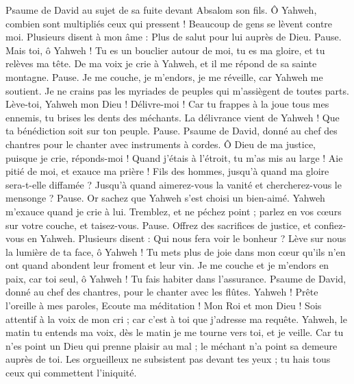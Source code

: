 \begin{multicols}{2}
\VerseOne{}Psaume de David au sujet de sa fuite devant Absalom son fils.
Ô Yahweh, combien sont multipliés ceux qui pressent ! Beaucoup de gens se lèvent contre moi.
Plusieurs disent à mon âme : Plus de salut pour lui auprès de Dieu. Pause.
Mais toi, ô Yahweh ! Tu es un bouclier autour de moi, tu es ma gloire, et tu relèves ma tête.
De ma voix je crie à Yahweh, et il me répond de sa sainte montagne. Pause.
Je me couche, je m’endors, je me réveille, car Yahweh me soutient.
Je ne crains pas les myriades de peuples qui m’assiègent de toutes parts.
Lève-toi, Yahweh mon Dieu ! Délivre-moi ! Car tu frappes à la joue tous mes ennemis, tu brises les dents des méchants.
La délivrance vient de Yahweh ! Que ta bénédiction soit sur ton peuple. Pause.
\VerseOne{}Psaume de David, donné au chef des chantres pour le chanter avec instruments à cordes.
Ô Dieu de ma justice, puisque je crie, réponds-moi ! Quand j’étais à l’étroit, tu m’as mis au large ! Aie pitié de moi, et exauce ma prière !
Fils des hommes, jusqu'à quand ma gloire sera-t-elle diffamée ? Jusqu’à quand aimerez-vous la vanité et chercherez-vous le mensonge ? Pause.
Or sachez que Yahweh s'est choisi un bien-aimé. Yahweh m'exauce quand je crie à lui.
Tremblez, et ne péchez point ; parlez en vos cœurs sur votre couche, et taisez-vous. Pause.
Offrez des sacrifices de justice, et confiez-vous en Yahweh.
Plusieurs disent : Qui nous fera voir le bonheur ? Lève sur nous la lumière de ta face, ô Yahweh !
Tu mets plus de joie dans mon cœur qu'ils n'en ont quand abondent leur froment et leur vin.
Je me couche et je m’endors en paix, car toi seul, ô Yahweh ! Tu fais habiter dans l’assurance.
\VerseOne{}Psaume de David, donné au chef des chantres, pour le chanter avec les flûtes.
Yahweh ! Prête l'oreille à mes paroles, Ecoute ma méditation !
Mon Roi et mon Dieu ! Sois attentif à la voix de mon cri ; car c'est à toi que j'adresse ma requête.
Yahweh, le matin tu entends ma voix, dès le matin je me tourne vers toi, et je veille.
Car tu n'es point un Dieu qui prenne plaisir au mal ; le méchant n’a point sa demeure auprès de toi.
Les orgueilleux ne subsistent pas devant tes yeux ; tu hais tous ceux qui commettent l’iniquité.

\end{multicols}
